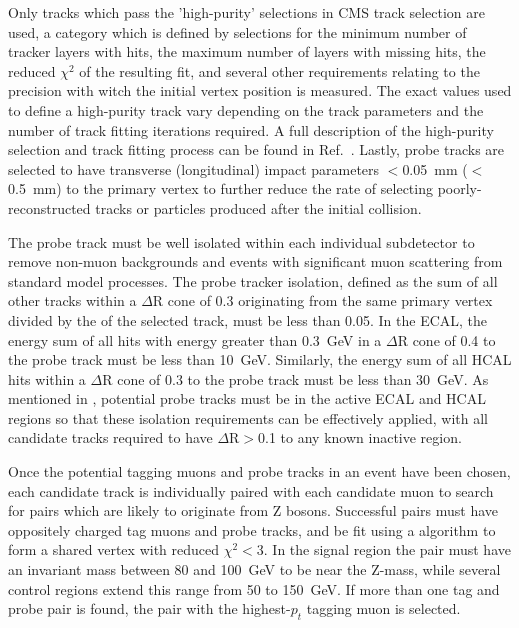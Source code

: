 Only tracks which pass the 'high-purity' selections in CMS track selection are used, a category which is defined by selections for the minimum number of tracker layers with hits, the maximum number of layers with missing hits, the reduced $\chi^2$ of the resulting fit, and several other requirements relating to the precision with witch the initial vertex position is measured.
The exact values used to define a high-purity track vary depending on the track parameters and the number of track fitting iterations required. 
A full description of the high-purity selection and track fitting process can be found in Ref.~\cite{trackFitting}.
Lastly, probe tracks are selected to have transverse (longitudinal) impact parameters $<$\SI{0.05}{\milli\meter} ($<$\SI{0.5}{\milli\meter}) to the primary vertex to further reduce the rate of selecting poorly-reconstructed tracks or particles produced after the initial collision.

The probe track must be well isolated within each individual subdetector to remove non-muon backgrounds and events with significant muon scattering from standard model processes. 
The probe tracker isolation, defined as the \pt sum of all other tracks within a $\Delta$R cone of 0.3 originating from the same primary vertex divided by the \pt of the selected track, must be less than 0.05.
In the ECAL, the energy sum of all hits with energy greater than \SI{0.3}{\giga\eV} in a $\Delta$R cone of 0.4 to the probe track must be less than \SI{10}{\giga\eV}.
Similarly, the energy sum of all HCAL hits within a $\Delta$R cone of 0.3 to the probe track must be less than \SI{30}{\giga\eV}. 
As mentioned in , potential probe tracks must be in the active ECAL and HCAL regions so that these isolation requirements can be effectively applied, with all candidate tracks required to have $\Delta$R$>$0.1 to any known inactive region.

Once the potential tagging muons and probe tracks in an event have been chosen, each candidate track is individually paired with each candidate muon to search for pairs which are likely to originate from Z bosons.
Successful pairs must have oppositely charged tag muons and probe tracks, and be fit using a \kf algorithm to form a shared vertex with reduced $\chi^2<$3.
In the signal region the pair must have an invariant mass between 80 and \SI{100}{\giga\eV} to be near the Z-mass, while several control regions extend this range from 50 to \SI{150}{\giga\eV}.
If more than one tag and probe pair is found, the pair with the highest-$p_t$ tagging muon is selected.

